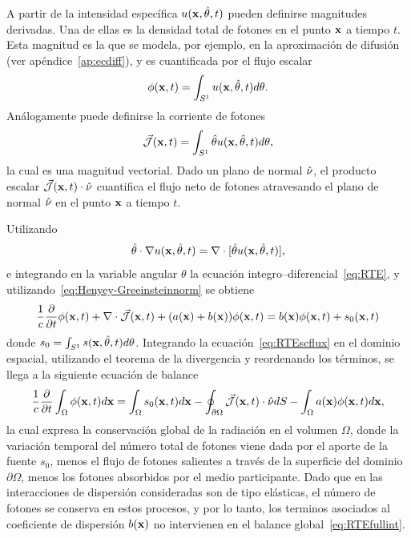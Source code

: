 A partir de la intensidad específica $u(\mathbf{x},\hat{\theta},t)$ pueden definirse magnitudes derivadas. 
Una de ellas es la densidad total de fotones 
en el punto $\mathbf{x}$ a tiempo $t$. Esta magnitud es la que se modela, por ejemplo, 
en la aproximación de difusión (ver apéndice~\ref{ap:ecdiff}), y es cuantificada por el flujo escalar
\begin{equation}
  \phi(\mathbf{x},t)=\int_{S^1} u(\mathbf{x},\hat{\theta},t) d\theta.
\label{eq:photondensity}
\end{equation}
Análogamente puede definirse la corriente de fotones 
\begin{equation}
 \vec{ \mathcal{J}}(\mathbf{x},t)=\int_{S^1} \hat{\theta} u(\mathbf{x},\hat{\theta},t) d\theta,
\label{eq:photoncurrent}
\end{equation}
la cual es una magnitud vectorial. Dado un plano de normal $\hat{\nu}$, 
el producto escalar $\vec{ \mathcal{J}}(\mathbf{x},t) \cdot \hat{\nu}$ 
cuantifica el flujo neto de fotones atravesando el plano de normal $ \hat{\nu}$ 
en el punto $\mathbf{x}$ a tiempo $t$.

Utilizando
\begin{equation}
\hat{\theta} \cdot \nabla u(\mathbf{x},\hat{\theta},t)=\nabla \cdot [\hat{\theta} u(\mathbf{x},\hat{\theta},t)],
\label{eq:scdiv}
\end{equation}
e integrando en la variable angular $\theta$
 la ecuación integro--diferencial~\eqref{eq:RTE}, y utilizando~\eqref{eq:Henyey-Greeinsteinnorm}  se obtiene
\begin{equation}
\frac{1}{c}\frac{\partial}{\partial t} \phi(\mathbf{x},t)+\nabla \cdot \vec{ \mathcal{J}}(\mathbf{x},t)
+(a(\mathbf{x})+b(\mathbf{x})) \phi(\mathbf{x},t)=b(\mathbf{x})\phi(\mathbf{x},t)+s_0(\mathbf{x},t)
\label{eq:RTEscflux}
\end{equation}
donde $s_0=\int_{S^1}s(\mathbf{x},\hat{\theta},t)d\theta$. Integrando la 
ecuación~\eqref{eq:RTEscflux} en el dominio espacial, utilizando el teorema de la divergencia
y reordenando los términos, se llega a la siguiente ecuación de balance
\begin{equation}
\frac{1}{c}\frac{\partial}{\partial t} \int_{\Omega}\phi(\mathbf{x},t)d\mathbf{x} = 
\int_{\Omega}s_0(\mathbf{x},t)d\mathbf{x}- \oint_{\partial \Omega} \vec{ \mathcal{J}}(\mathbf{x},t)\cdot \hat{\nu} dS-\int_{\Omega}a(\mathbf{x})\phi(\mathbf{x},t)d\mathbf{x},
\label{eq:RTEfullint}
\end{equation}
la cual expresa la conservación global de la radiación en el volumen $\Omega$, 
donde la variación temporal del número total de fotones 
viene dada por el aporte de la fuente $s_0$, menos el flujo de fotones salientes 
 a través de la superficie del 
dominio $\partial \Omega$, menos los fotones absorbidos 
por el medio participante. 
Dado que en 
las interacciones de dispersión consideradas son de tipo elásticas, el número 
de fotones se conserva en estos procesos, y por lo tanto, los terminos asociados 
al coeficiente de dispersión $b(\mathbf{x})$ no intervienen en el balance global~\eqref{eq:RTEfullint}. 

